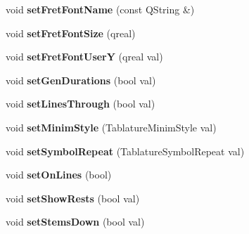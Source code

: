 \begin{DoxyCompactItemize}
\item 
\mbox{\label{class_ms_1_1_staff_type_ae07af1d002f1ec8897fb4da3667a77bb}} 
void {\bfseries set\+Fret\+Font\+Name} (const Q\+String \&)
\item 
\mbox{\label{class_ms_1_1_staff_type_a4fb0623d53346feba8d6537c81ab9306}} 
void {\bfseries set\+Fret\+Font\+Size} (qreal)
\item 
\mbox{\label{class_ms_1_1_staff_type_a6b76b350fc74a558033cae8850b5de77}} 
void {\bfseries set\+Fret\+Font\+UserY} (qreal val)
\item 
\mbox{\label{class_ms_1_1_staff_type_af6ad96baa0273e7aa942a7103cf80c41}} 
void {\bfseries set\+Gen\+Durations} (bool val)
\item 
\mbox{\label{class_ms_1_1_staff_type_a6aea129f62d439b384d7a20c7a651b5f}} 
void {\bfseries set\+Lines\+Through} (bool val)
\item 
\mbox{\label{class_ms_1_1_staff_type_ac4092eaeede4a93da09e86f96af5bd9c}} 
void {\bfseries set\+Minim\+Style} (Tablature\+Minim\+Style val)
\item 
\mbox{\label{class_ms_1_1_staff_type_a0a1f6280adbabf38a9c3768b106ba48e}} 
void {\bfseries set\+Symbol\+Repeat} (Tablature\+Symbol\+Repeat val)
\item 
\mbox{\label{class_ms_1_1_staff_type_a3b518a2bb0b7bb44bb658c74a93a92ca}} 
void {\bfseries set\+On\+Lines} (bool)
\item 
\mbox{\label{class_ms_1_1_staff_type_aabc2f61d52e21747cbc8545ca84ac377}} 
void {\bfseries set\+Show\+Rests} (bool val)
\item 
\mbox{\label{class_ms_1_1_staff_type_a974b2ddf4c2613f6587ce47b0415431d}} 
void {\bfseries set\+Stems\+Down} (bool val)
\item 
\mbox{\label{class_ms_1_1_staff_type_a3e85d0eea9247d2117962cf3a72a8671}} 

\end{DoxyCompactItemize}
